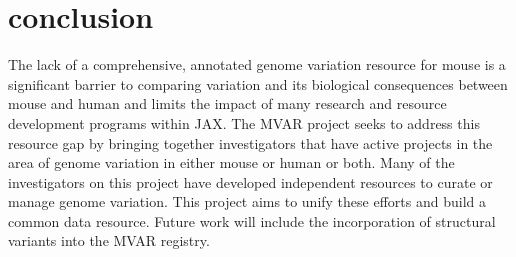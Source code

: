 \documentclass{article}
\begin{document}
\section{conclusion}

The lack of a comprehensive, annotated genome variation resource for mouse is a significant barrier to comparing variation and its biological consequences between mouse and human and limits the impact of many research and resource development programs within JAX. The MVAR project seeks to address this resource gap by bringing together investigators that have active projects in the area of genome variation in either mouse or human or both. Many of the investigators on this project have developed independent resources to curate or manage genome variation. This project aims to unify these efforts and build a common data resource. Future work will include the incorporation of structural variants into the MVAR registry.



\end{document}
